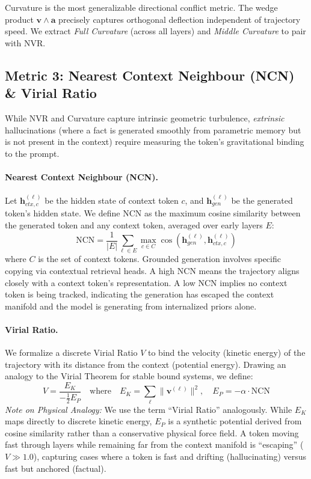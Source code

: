 \documentclass[10pt]{article}
\begin{document}
Curvature is the most generalizable directional conflict metric. The wedge product $\mathbf{v} \wedge \mathbf{a}$ precisely captures orthogonal deflection independent of trajectory speed. We extract \emph{Full Curvature} (across all layers) and \emph{Middle Curvature} to pair with NVR.

\subsection{Metric 3: Nearest Context Neighbour (NCN) \& Virial Ratio}
\label{sec:ncn}

While NVR and Curvature capture intrinsic geometric turbulence, \emph{extrinsic} hallucinations (where a fact is generated smoothly from parametric memory but is not present in the context) require measuring the token's gravitational binding to the prompt.

\paragraph{Nearest Context Neighbour (NCN).}
Let $\mathbf{h}_{ctx, c}^{(\ell)}$ be the hidden state of context token $c$, and $\mathbf{h}_{gen}^{(\ell)}$ be the generated token's hidden state. We define NCN as the maximum cosine similarity between the generated token and any context token, averaged over early layers $E$:
\begin{equation}
\label{eq:ncn}
\text{NCN} = \frac{1}{|E|} \sum_{\ell \in E} \max_{c \in C} \cos\left(\mathbf{h}_{gen}^{(\ell)}, \mathbf{h}_{ctx, c}^{(\ell)}\right)
\end{equation}
where $C$ is the set of context tokens. Grounded generation involves specific copying via contextual retrieval heads. A high NCN means the trajectory aligns closely with a context token's representation. A low NCN implies no context token is being tracked, indicating the generation has escaped the context manifold and the model is generating from internalized priors alone.

\paragraph{Virial Ratio.}
We formalize a discrete Virial Ratio $V$ to bind the velocity (kinetic energy) of the trajectory with its distance from the context (potential energy). Drawing an analogy to the Virial Theorem for stable bound systems, we define:
\begin{equation}
\label{eq:virial}
V = \frac{E_K}{-\frac{1}{2} E_P} \quad \text{where} \quad E_K = \sum_{\ell} \|\mathbf{v}^{(\ell)}\|^2, \quad E_P = -\alpha \cdot \text{NCN}
\end{equation}
\emph{Note on Physical Analogy:} We use the term ``Virial Ratio'' analogously. While $E_K$ maps directly to discrete kinetic energy, $E_P$ is a synthetic potential derived from cosine similarity rather than a conservative physical force field. A token moving fast through layers while remaining far from the context manifold is ``escaping'' ($V \gg 1.0$), capturing cases where a token is fast and drifting (hallucinating) versus fast but anchored (factual).
\end{document}
